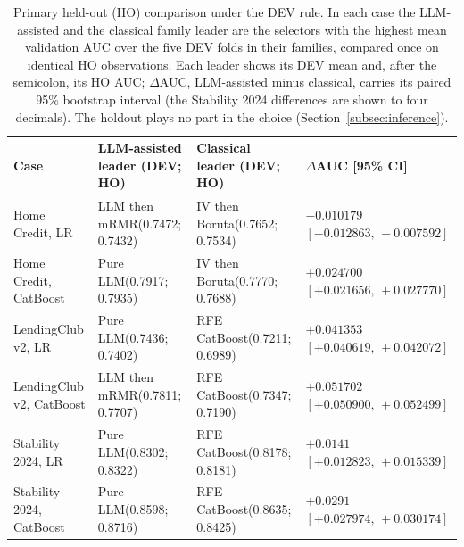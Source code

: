 \documentclass[final,5p,twocolumn]{elsarticle}
\begin{document}
\begin{table}[htbp]
\centering
\scriptsize
\setlength{\tabcolsep}{3pt}
\begin{threeparttable}
\caption{Primary held-out (HO) comparison under the DEV rule. In each case the LLM-assisted and the classical family leader are the selectors with the highest mean validation AUC over the five DEV folds in their families, compared once on identical HO observations. Each leader shows its DEV mean and, after the semicolon, its HO AUC; $\Delta$AUC, LLM-assisted minus classical, carries its paired 95\% bootstrap interval (the Stability 2024 differences are shown to four decimals). The holdout plays no part in the choice (Section~\ref{subsec:inference}).}
\label{tab:confirmatory}
\begin{tabular}{@{}L{24mm}L{30mm}L{27mm}L{38mm}@{}}
\toprule
Case & LLM-assisted leader (DEV; HO) & Classical leader (DEV; HO) & $\Delta$AUC [95\% CI] \\
\midrule
Home Credit, LR & LLM then mRMR\newline (0.7472; 0.7432) & IV then Boruta\newline (0.7652; 0.7534) & $-0.010179$\newline $[-0.012863,\,-0.007592]$ \\
\addlinespace
Home Credit, CatBoost & Pure LLM\newline (0.7917; 0.7935) & IV then Boruta\newline (0.7770; 0.7688) & $+0.024700$\newline $[+0.021656,\,+0.027770]$ \\
\addlinespace
LendingClub v2, LR & Pure LLM\newline (0.7436; 0.7402) & RFE CatBoost\newline (0.7211; 0.6989) & $+0.041353$\newline $[+0.040619,\,+0.042072]$ \\
\addlinespace
LendingClub v2, CatBoost & LLM then mRMR\newline (0.7811; 0.7707) & RFE CatBoost\newline (0.7347; 0.7190) & $+0.051702$\newline $[+0.050900,\,+0.052499]$ \\
\addlinespace
Stability 2024, LR & Pure LLM\newline (0.8302; 0.8322) & RFE CatBoost\newline (0.8178; 0.8181) & $+0.0141$\newline $[+0.012823,\,+0.015339]$ \\
\addlinespace
Stability 2024, CatBoost & Pure LLM\newline (0.8598; 0.8716) & RFE CatBoost\newline (0.8635; 0.8425) & $+0.0291$\newline $[+0.027974,\,+0.030174]$ \\
\bottomrule
\end{tabular}
\end{threeparttable}
\end{table}
\end{document}
